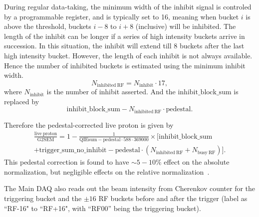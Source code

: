 \documentclass[../main.tex]{subfiles}
\begin{document}
During regular data-taking, the minimum width of the inhibit signal is controled by a programmable
register, and is typically set to 16, meaning when bucket $i$ is above the threshold, buckets $i-8$
to $i+8$ (inclusive) will be inhibited. The length of the inhibit can be longer if a series
of high intensity buckets arrive in succession. In this situation, the inhibit will extend till 8
buckets after the last high intensity bucket. However, the length of each inhibit is not always available.
Hence the number of inhibited buckets is estimated using the minimum inhibit width.
\begin{equation}
	N_{\mathrm{inhibited\ RF}}=N_{\mathrm{inhibit}}\cdot 17,
\end{equation}
where $N_{\mathrm{inhibit}}$ is the number of inhibit asserted.
And the $\mathrm{inhibit\_block\_sum}$ is replaced by
\begin{equation}
	\mathrm{inhibit\_block\_sum}-N_{\mathrm{inhibited\ RF}}\cdot\mathrm{pedestal}.
\end{equation}

Therefore the pedestal-corrected live proton is given by
\begin{multline}
	\frac{\mathrm{live\ proton}}{\mathrm{G2SEM}}= 1-\frac{1}{\mathrm{QIEsum}-\mathrm{pedestal}\cdot 588\cdot 369000}\times\big[\mathrm{inhibit\_block\_sum}\\
		+\mathrm{trigger\_sum\_no\_inhibit}-\mathrm{pedestal}\cdot\left(N_{\mathrm{inhibited\ RF}}+N_{\mathrm{busy\ RF}}\right)\big].
	\label{eq:livePoT-new}
\end{multline}
This pedestal correction is found to have $\sim 5-10\%$ effect on the absolute normalization,
but negligible effects on the relative normalization~\cite{chleung-10679}.


The Main DAQ also reads out the beam intensity from Cherenkov counter for the triggering bucket
and the $\pm16$ RF buckets before and after the trigger (label as ``RF-16" to ``RF+16", with
``RF00'' being the triggering bucket).
\end{document}
